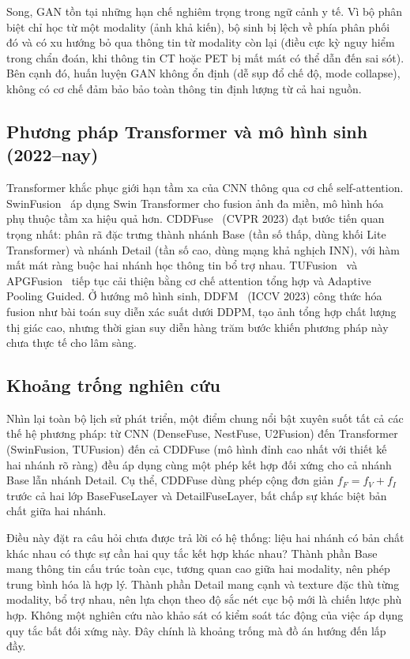 Song, GAN tồn tại những hạn chế nghiêm trọng trong ngữ cảnh y tế. Vì bộ phân biệt chỉ học từ một modality (ảnh khả kiến), bộ sinh bị lệch về phía phân phối đó và có xu hướng bỏ qua thông tin từ modality còn lại (điều cực kỳ nguy hiểm trong chẩn đoán, khi thông tin CT hoặc PET bị mất mát có thể dẫn đến sai sót). Bên cạnh đó, huấn luyện GAN không ổn định (dễ sụp đổ chế độ, mode collapse), không có cơ chế đảm bảo bảo toàn thông tin định lượng từ cả hai nguồn.

\subsection{Phương pháp Transformer và mô hình sinh (2022--nay)}
\label{ssec:related-transformer}

Transformer khắc phục giới hạn tầm xa của CNN thông qua cơ chế self-attention. SwinFusion~\cite{ma2022swinfusion} áp dụng Swin Transformer cho fusion ảnh đa miền, mô hình hóa phụ thuộc tầm xa hiệu quả hơn. CDDFuse~\cite{zhao2023cddfuse} (CVPR 2023) đạt bước tiến quan trọng nhất: phân rã đặc trưng thành nhánh Base (tần số thấp, dùng khối Lite Transformer) và nhánh Detail (tần số cao, dùng mạng khả nghịch INN), với hàm mất mát ràng buộc hai nhánh học thông tin bổ trợ nhau. TUFusion~\cite{zhao2024tufusion} và APGFusion~\cite{hu2024apgfusion} tiếp tục cải thiện bằng cơ chế attention tổng hợp và Adaptive Pooling Guided. Ở hướng mô hình sinh, DDFM~\cite{zhao2023ddfm} (ICCV 2023) công thức hóa fusion như bài toán suy diễn xác suất dưới DDPM, tạo ảnh tổng hợp chất lượng thị giác cao, nhưng thời gian suy diễn hàng trăm bước khiến phương pháp này chưa thực tế cho lâm sàng.

\subsection{Khoảng trống nghiên cứu}
\label{ssec:related-gap}

Nhìn lại toàn bộ lịch sử phát triển, một điểm chung nổi bật xuyên suốt tất cả các thế hệ phương pháp: từ CNN (DenseFuse, NestFuse, U2Fusion) đến Transformer (SwinFusion, TUFusion) đến cả CDDFuse (mô hình đỉnh cao nhất với thiết kế hai nhánh rõ ràng) đều áp dụng cùng một phép kết hợp đối xứng cho cả nhánh Base lẫn nhánh Detail. Cụ thể, CDDFuse dùng phép cộng đơn giản $f_F = f_V + f_I$ trước cả hai lớp BaseFuseLayer và DetailFuseLayer, bất chấp sự khác biệt bản chất giữa hai nhánh.

Điều này đặt ra câu hỏi chưa được trả lời có hệ thống: liệu hai nhánh có bản chất khác nhau có thực sự cần hai quy tắc kết hợp khác nhau? Thành phần Base mang thông tin cấu trúc toàn cục, tương quan cao giữa hai modality, nên phép trung bình hóa là hợp lý. Thành phần Detail mang cạnh và texture đặc thù từng modality, bổ trợ nhau, nên lựa chọn theo độ sắc nét cục bộ mới là chiến lược phù hợp. Không một nghiên cứu nào khảo sát có kiểm soát tác động của việc áp dụng quy tắc bất đối xứng này. Đây chính là khoảng trống mà đồ án hướng đến lấp đầy.

